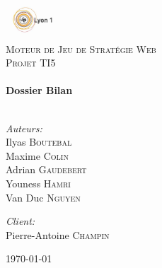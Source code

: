 \begin{titlepage}

\begin{center}

\includegraphics[width=0.15\textwidth]{img/logo_ucbl.jpg}\\[1cm]

\textsc{\LARGE Moteur de Jeu de Stratégie Web}\\[1.5cm]

\textsc{\Large Projet TI5}\\[0.5cm]

\HRule \\[0.6cm]
{ \huge \bfseries Dossier Bilan}\\[0.4cm]

\HRule \\[1.5cm]

\begin{minipage}{0.4\textwidth}
\begin{flushleft} \large
\emph{Auteurs:}\\
Ilyas \textsc{Boutebal}\\ Maxime \textsc{Colin}\\ Adrian \textsc{Gaudebert}\\ Youness \textsc{Hamri}\\ Van Duc \textsc{Nguyen}
\end{flushleft}
\end{minipage}
\begin{minipage}{0.4\textwidth}
\begin{flushright} \large
\emph{Client:} \\
Pierre-Antoine \textsc{Champin}
\end{flushright}
\end{minipage}

\vfill

{\large \today}

\end{center}

\end{titlepage}
